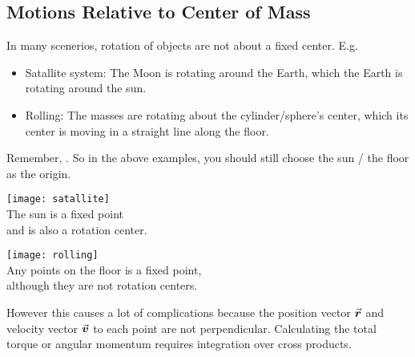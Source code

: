 \documentclass[class=article, crop=false, 12pt]{standalone}
\begin{document}
\newpage
\subsection{Motions Relative to Center of Mass}

In many scenerios, 
rotation of objects are not about a fixed center. E.g. 
\begin{itemize}
    \item Satallite system: The Moon is rotating around the Earth, 
    which the Earth is rotating around the sun.
    \item Rolling: The masses are rotating about the cylinder/sphere's center, 
    which its center is moving in a straight line along the floor.
\end{itemize}

Remember, . 
So in the above examples, you should still choose the sun / the floor as the origin.

\begin{center}
    \begin{minipage}{0.45\linewidth}
        \centering
        \texttt{[image: satallite]}\\
        The sun is a fixed point\\and is also a rotation center. 
    \end{minipage}
    \hspace{1.5em}
    \vline
    \hspace{1.5em}
    \begin{minipage}{0.45\linewidth}
        \centering
        \texttt{[image: rolling]}\\
        Any points on the floor is a fixed point,\\
        although they are not rotation centers.
    \end{minipage}
\end{center}

However this causes a lot of complications because the position vector $\va*{r}$ and velocity vector $\va*{v}$ 
to each point are not perpendicular. 
Calculating the total torque or angular momentum requires integration over cross products.
\end{document}

